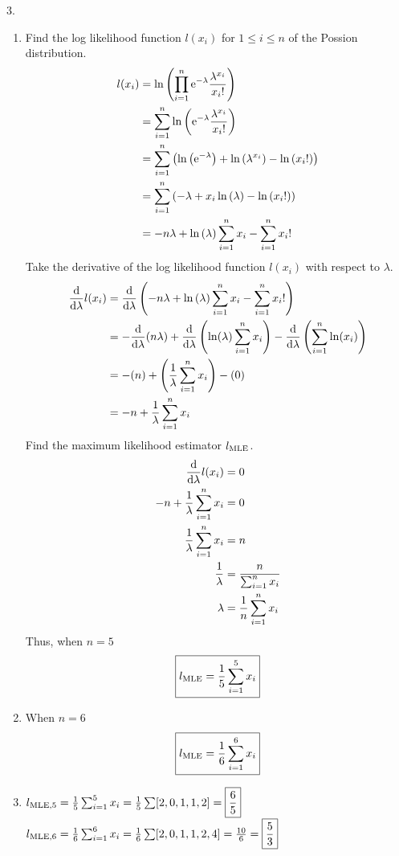 3.
\begin{enumerate}
    \item 
	Find the log likelihood function $l(x_i)$ for $1 \leq i \leq n$ of the Possion distribution.
	\begin{align*}
	    l(x_i) &= \ln \left( \prod_{i=1}^n {\rm e}^{-\lambda} \frac{\lambda^{x_i}}{x_i!} \right) \\
		&= \sum_{i=1}^n \ln \left( {\rm e}^{-\lambda} \frac{\lambda^{x_i}}{x_i!} \right) \\
		&= \sum_{i=1}^n \left( \ln\left( {\rm e}^{-\lambda} \right) + \ln\left( \lambda^{x_i} \right) - \ln\left( x_i! \right) \right) \\
		&= \sum_{i=1}^n \left( -\lambda + x_i \ln\left(\lambda \right) - \ln\left( x_i! \right) \right) \\
		&= -n \lambda + \ln\left(\lambda \right) \sum_{i=1}^n x_i - \sum_{i=1}^n x_i ! 
	\end{align*}
	Take the derivative of the log likelihood function $l(x_i)$ with respect to $\lambda$.
	\begin{align*}
	    \frac{{\rm d}}{{\rm d}\lambda} l(x_i) &= \frac{{\rm d}}{{\rm d}\lambda} \left( -n \lambda + \ln\left(\lambda \right) \sum_{i=1}^n x_i - \sum_{i=1}^n x_i ! \right) \\
		&= - \frac{{\rm d}}{{\rm d}\lambda} (n \lambda) + \frac{{\rm d}}{{\rm d}\lambda} \left( \ln(\lambda) \sum_{i=1}^n x_i \right) - \frac{{\rm d}}{{\rm d}\lambda} \left( \sum_{i=1}^n \ln(x_i) \right) \\
		&= - (n) + \left( \frac{1}{\lambda} \sum_{i=1}^n x_i \right) - (0) \\
		&= - n + \frac{1}{\lambda} \sum_{i=1}^n x_i
	\end{align*}
	Find the maximum likelihood estimator $l_{{\rm MLE}}$.
	\begin{align*}
	    \frac{{\rm d}}{{\rm d}\lambda} l(x_i) &= 0 \\
	    - n + \frac{1}{\lambda} \sum_{i=1}^n x_i &= 0 \\
	    \frac{1}{\lambda} \sum_{i=1}^n x_i &= n \\
	    \frac{1}{\lambda} &= \frac{n}{\sum_{i=1}^n x_i} \\
	    \lambda &= \frac{1}{n} \sum_{i=1}^n x_i
	\end{align*}
	Thus, when $n=5$ $$\boxed{ l_{{\rm MLE}} = \frac{1}{5} \sum_{i=1}^5 x_i }$$
    \item
	When $n=6$ $$\boxed{ l_{{\rm MLE}} = \frac{1}{6} \sum_{i=1}^6 x_i }$$
    \item
	$l_{{\rm MLE, 5}} = \frac{1}{5} \sum_{i=1}^5 x_i = \frac{1}{5} \sum [2, 0, 1, 1, 2] = \boxed{\frac{6}{5}}$ \\ 
	$l_{{\rm MLE, 6}} = \frac{1}{6} \sum_{i=1}^6 x_i = \frac{1}{6} \sum [2, 0, 1, 1, 2, 4] = \frac{10}{6} = \boxed{\frac{5}{3}}$
\end{enumerate}
